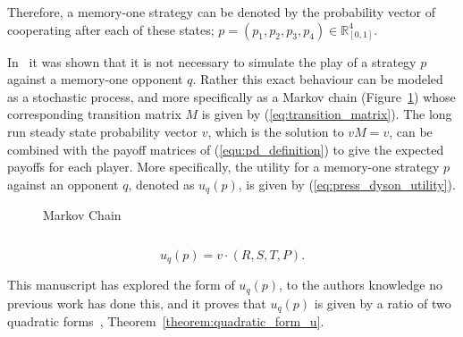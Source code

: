 \documentclass[10pt]{article}
\newcommand{\R}{\mathbb{R}}
\begin{document}
Therefore, a memory-one strategy can be denoted by the probability vector of
cooperating after each of these states; \(p=(p_1, p_2, p_3, p_4) \in \R_{[0,1]}
^ 4\).

In~\cite{Nowak1989} it was shown that it is not necessary to simulate the play
of a strategy $p$ against a memory-one opponent $q$. Rather this exact behaviour
can be modeled as a stochastic process, and more specifically as a Markov chain
(Figure~\ref{fig:markov_chain}) whose corresponding transition matrix \(M\) is
given by (\ref{eq:transition_matrix}). The long run steady state probability
vector \(v\), which is the solution to \(v M = v\), can be
combined with the payoff matrices of (\ref{equ:pd_definition}) to give the expected
payoffs for each player. More specifically, the utility for a memory-one
strategy \(p\) against an opponent \(q\), denoted as \(u_q(p)\), is given by
(\ref{eq:press_dyson_utility}).

\begin{figure}
    \centering
    
    \caption{Markov Chain}
    \label{fig:markov_chain}
\end{figure}

\begin{equation}\label{eq:transition_matrix}
    
\end{equation}


\begin{equation}\label{eq:press_dyson_utility}
    u_q(p) = v \cdot (R, S, T, P).
\end{equation}

This manuscript has explored the form of \(u_q(p)\), to the authors knowledge no
previous work has done this, and it proves that \(u_q(p)\) is given by a ratio
of two quadratic forms~\cite{kepner2011},
Theorem~\ref{theorem:quadratic_form_u}.
\end{document}
